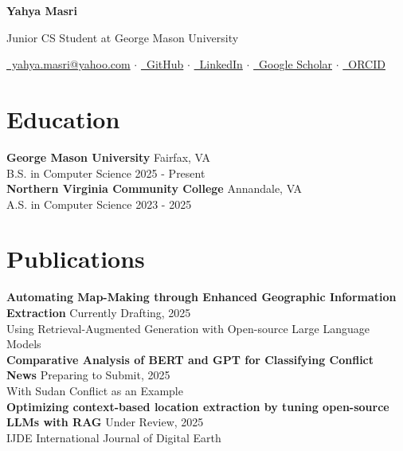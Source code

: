 \documentclass[11pt,a4paper]{article}
\begin{document}
\begin{center}
{\huge \textbf{Yahya Masri}}

\vspace{0.5em}
{\large Junior CS Student at George Mason University}

\vspace{0.3em}
\href{mailto:yahya.masri@yahoo.com}{\faEnvelope\ yahya.masri@yahoo.com} $\cdot$
\href{https://github.com/yahya3867}{\faGithub\ GitHub} $\cdot$
\href{https://www.linkedin.com/in/yahya-masri}{\faLinkedin\ LinkedIn} $\cdot$
\href{https://scholar.google.com/citations?user=9H1ryOAAAAAJ&hl=en}{\faGraduationCap\ Google Scholar} $\cdot$
\href{https://orcid.org/0009-0005-7053-7844}{\faLink\ ORCID}
\end{center}

\section*{Education}
\textbf{George Mason University} \hfill Fairfax, VA\\
B.S. in Computer Science \hfill 2025 - Present\\[0.5em]
\textbf{Northern Virginia Community College} \hfill Annandale, VA\\
A.S. in Computer Science \hfill 2023 - 2025

\section*{Publications}
\textbf{Automating Map-Making through Enhanced Geographic Information Extraction} \hfill Currently Drafting, 2025\\
Using Retrieval-Augmented Generation with Open-source Large Language Models\\[0.5em]
\textbf{Comparative Analysis of BERT and GPT for Classifying Conflict News} \hfill Preparing to Submit, 2025\\
With Sudan Conflict as an Example\\[0.5em]
\textbf{Optimizing context-based location extraction by tuning open-source LLMs with RAG} \hfill Under Review, 2025\\
IJDE International Journal of Digital Earth
\end{document}
